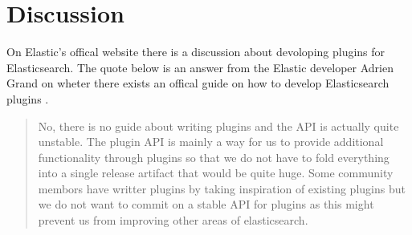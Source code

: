 \section{Discussion}
\label{sec:discussion}
On Elastic's offical website there is a discussion about devoloping plugins for Elasticsearch.
The quote below is an answer from the Elastic developer Adrien Grand on wheter there exists an offical guide on how to develop Elasticsearch plugins \cite{elasticsearch-plugin-quote}.

\begin{quote}
  No, there is no guide about writing plugins and the API is actually quite unstable.
  The plugin API is mainly a way for us to provide additional functionality through plugins so that we do not have to fold everything into a single release artifact that would be quite huge.
  Some community membors have writter plugins by taking inspiration of existing plugins but we do not want to commit on a stable API for plugins as this might prevent us from improving other areas of elasticsearch.
\end{quote}
